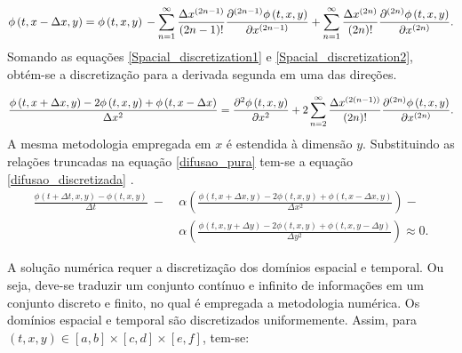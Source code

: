 \documentclass[10pt,twoside,a4paper]{article}
\begin{document}
	\begin{equation} \label{Spacial_discretization2}
	\phi \left(t, x-\Delta x, y \right)= \phi \left(t, x, y\right) \\
	-\sum\limits_{n=1}^{\infty} \frac{\Delta x^{\left(2n-1\right)}}{\left(2n-1\right)!} \frac{\partial^{\left(2n-1\right)} \phi \left(t, x, y\right)}{\partial x^{\left(2n-1\right)}}\\
	+\sum\limits_{n=1}^{\infty} \frac{\Delta x^{\left(2n\right)}}{\left(2n\right)!} \frac{\partial^{\left(2n\right)} \phi \left(t, x, y\right)}{\partial x^{\left(2n\right)}}.
	\end{equation}
	Somando as equações \ref{Spacial_discretization1} e \ref{Spacial_discretization2}, obtém-se a discretização para a derivada segunda em uma das direções. 
	
	\begin{equation} \label{Spacial_discretization3}
	\frac{\phi \left(t, x+\Delta x, y\right)-2 \phi \left(t, x, y\right) + \phi \left(t, x-\Delta x\right)}{\Delta x^2} = \\
	\frac{\partial^{2} \phi \left(t, x, y\right)}{\partial x^{2}}+ \\
	2 \sum\limits_{n=2}^{\infty} \frac{ \Delta x^{\left(2\left(n-1\right)\right)}}{\left(2n\right)!} \frac{\partial^{\left(2n\right)} \phi \left(t, x, y\right)}{\partial x^{\left(2n\right)}}.
	\end{equation}
	A mesma metodologia empregada em $x$ é estendida à dimensão $y$.
	Substituindo as relações truncadas na equação \ref{difusao_pura} tem-se a equação \ref{difusao_discretizada} .
	\begin{equation} \label{difusao_discretizada}
	\begin{split}
	\frac{\phi \left(t+\Delta t, x, y\right)-\phi \left(t, x, y\right)}{\Delta t} \ - \ &\alpha \left( \frac{\phi \left(t, x+ \Delta x, y \right)-2 \phi \left(t, x, y \right) + \phi \left(t, x- \Delta x, y \right)}{\Delta x^2} \right) -\\
	&\alpha \left( \frac{\phi \left(t, x, y+ \Delta y \right)-2 \phi \left(t, x, y \right) + \phi \left(t, x, y- \Delta y \right)}{\Delta y^2} \right) \approx 0 .%
	\end{split}
	\end{equation}
	
	
	A solução numérica requer a discretização dos domínios espacial e temporal. Ou seja, deve-se traduzir um
	conjunto contínuo e infinito de informações em um conjunto discreto e finito, no qual é empregada a metodologia numérica. Os domínios espacial e temporal são discretizados uniformemente. Assim, para $(t,x,y) \in [a,b] \times [c,d] \times [e,f]$, tem-se:
	
\end{document}
